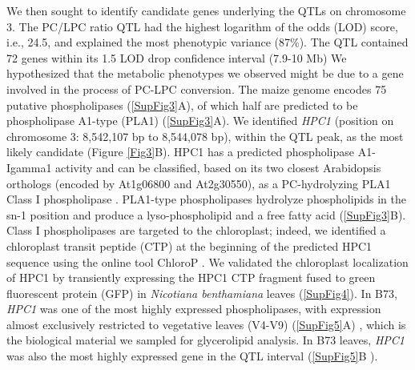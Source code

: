 \documentclass[9pt,twocolumn,twoside,lineno]{biorxiv}
\begin{document}
We then sought to identify candidate genes underlying the QTLs on chromosome 3.
The PC/LPC ratio QTL had the highest logarithm of the odds (LOD) score, i.e., 24.5, and explained the most phenotypic variance (87\%). 
The QTL contained 72 genes within its 1.5 LOD drop confidence interval (7.9-10 Mb) 
We hypothesized that the metabolic phenotypes we observed might be due to a gene involved in the process of PC-LPC conversion.  
The maize genome encodes 75 putative phospholipases (\ref{SupFig3}A), of which half are predicted to be phospholipase A1-type (PLA1) (\ref{SupFig3}A).  
We identified \textit{HPC1} (position on chromosome 3: 8,542,107 bp to 8,544,078 bp), within the QTL peak, as the most likely candidate (Figure \ref{Fig3}B). 
HPC1 has a predicted phospholipase A1-Igamma1 activity and can be classified, based on its two closest Arabidopsis orthologs (encoded by At1g06800 and At2g30550), as a PC-hydrolyzing PLA1 Class I phospholipase \cite{Ryu2004-iv}. 
PLA1-type phospholipases hydrolyze phospholipids in the sn-1 position and produce a lyso-phospholipid and a free fatty acid (\ref{SupFig3}B). 
Class I phospholipases are targeted to the chloroplast; indeed, we identified a chloroplast transit peptide (CTP) at the beginning of the predicted HPC1 sequence using the online tool ChloroP \cite{Emanuelsson1999-rs}.
We validated the chloroplast localization of HPC1 by transiently expressing  the HPC1 CTP fragment fused to green fluorescent protein (GFP) in \textit{Nicotiana benthamiana} leaves (\ref{SupFig4}).
In B73, \textit{HPC1} was one of the most highly expressed phospholipases, with expression almost exclusively restricted to vegetative leaves (V4-V9) (\ref{SupFig5}A) \cite{Stelpflug2016-vr}, which is the biological material we sampled for glycerolipid analysis. 
In B73 leaves, \textit{HPC1} was also the most highly expressed gene in the QTL interval (\ref{SupFig5}B \cite{Stelpflug2016-vr}).
\end{document}
